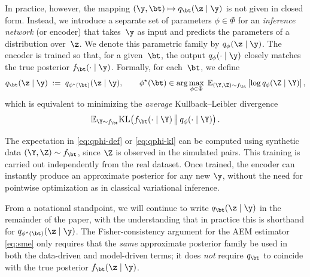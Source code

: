 In practice, however, the mapping $(\y, \bt) \mapsto q_\bt(\z \mid \y)$ is not given 
in closed form. Instead, we introduce a separate set of parameters $\phi \in \Phi$ 
for an \emph{inference network} (or encoder) that takes~$\y$ as input and predicts 
the parameters of a distribution over~$\z$. We denote this parametric family by 
$q_\phi(\z \mid \y)$. The encoder is trained so that, for a given~$\bt$, the output 
$q_\phi(\cdot \mid \y)$ closely matches the true posterior 
$f_\bt(\cdot \mid \y)$. Formally, for each~$\bt$, we define
\begin{equation}
q_\bt(\z \mid \y) 
\;:=\; q_{\phi^\star(\bt)}(\z \mid \y),
\qquad
\phi^\star(\bt) \in 
\arg\max_{\phi \in \Phi} 
\; \mathbb{E}_{(\Y,\Z) \sim f_\bt} 
    \left[ \log q_\phi(\Z \mid \Y) \right],
\label{eq:qphi-def}
\end{equation}
which is equivalent to minimizing the \emph{average} Kullback--Leibler divergence
\begin{equation}
\mathbb{E}_{\Y \sim f_\bt} 
    \mathrm{KL} \!\left( f_\bt(\cdot \mid \Y) \,\big\|\, q_\phi(\cdot \mid \Y) \right).
\label{eq:qphi-kl}
\end{equation}

The expectation in \eqref{eq:qphi-def} or \eqref{eq:qphi-kl} can be computed 
using synthetic data $(\Y,\Z) \sim f_\bt$, since $\Z$ is observed in the simulated 
pairs. This training is carried out independently from the real dataset. Once trained, 
the encoder can instantly produce an approximate posterior for any new $\y$, 
without the need for pointwise optimization as in classical variational inference.

From a notational standpoint, we will continue to write $q_\bt(\z \mid \y)$ in 
the remainder of the paper, with the understanding that in practice this is 
shorthand for $q_{\phi^\star(\bt)}(\z \mid \y)$. The Fisher-consistency argument 
for the AEM estimator \eqref{eq:sme} only requires that the \emph{same} approximate 
posterior family be used in both the data-driven and model-driven terms; it does 
\emph{not} require $q_\bt$ to coincide with the true posterior $f_\bt(\z \mid \y)$.


